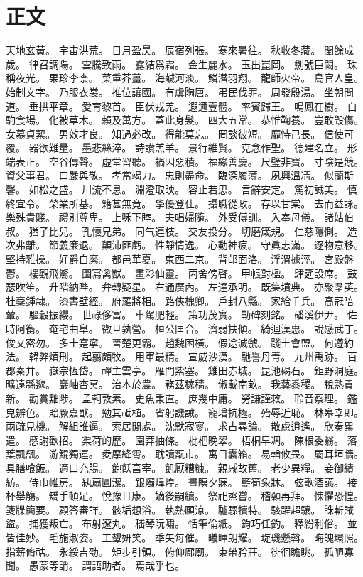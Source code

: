 \chapter{正文}%
\watermarkoff%
\thispagestyle{mychapter}%
\pagestyle{mytext}%
\ugenkogt%


天地玄黃。%
宇宙洪荒。%
日月盈昃。%
辰宿列張。%
寒來暑往。%
秋收冬藏。%
閏餘成歲。%
律召調陽。%
雲騰致雨。%
露結爲霜。%
金生麗水。%
玉出崑岡。%
劍號巨闕。%
珠稱夜光。%
果珍李柰。%
菜重芥薑。%
海鹹河淡。%
鱗潛羽翔。%
龍師火帝。%
鳥官人皇。%
始制文字。%
乃服衣裳。%
推位讓國。%
有虞陶唐。%
弔民伐罪。%
周發殷湯。%
坐朝問道。%
垂拱平章。%
愛育黎首。%
臣伏戎羌。%
遐邇壹體。%
率賓歸王。%
鳴鳳在樹。%
白駒食場。%
化被草木。%
賴及萬方。%
蓋此身髮。%
四大五常。%
恭惟鞠養。%
豈敢毀傷。%
女慕貞絜。%
男效才良。%
知過必改。%
得能莫忘。%
罔談彼短。%
靡恃己長。%
信使可覆。%
器欲難量。%
墨悲絲淬。%
詩讃羔羊。%
景行維賢。%
克念作聖。%
德建名立。%
形端表正。%
空谷傳聲。%
虛堂習聽。%
禍因惡積。%
福緣善慶。%
尺璧非寶。%
寸陰是競。%
資父事君。%
曰嚴與敬。%
孝當竭力。%
忠則盡命。%
臨深履薄。%
夙興溫凊。%
似蘭斯馨。%
如松之盛。%
川流不息。%
淵澄取映。%
容止若思。%
言辭安定。%
篤初誠美。%
慎終宜令。%
榮業所基。%
籍甚無竟。%
學優登仕。%
攝職從政。%
存以甘棠。%
去而益詠。%
樂殊貴賤。%
禮別尊卑。%
上咊下睦。%
夫唱婦隨。%
外受傅訓。%
入奉母儀。%
諸姑伯叔。%
猶子比兒。%
孔懷兄弟。%
同气連枝。%
交友投分。%
切磨箴規。%
仁慈隱惻。%
造次弗離。%
節義廉退。%
顛沛匪虧。%
性靜情逸。%
心動神疲。%
守眞志滿。%
逐物意移。%
堅持雅操。%
好爵自縻。%
都邑華夏。%
東西二京。%
背邙面洛。%
浮渭據涇。%
宮殿盤鬱。%
樓觀飛驚。%
圖寫禽獸。%
畫彩仙靈。%
丙舍傍啓。%
甲帳對楹。%
肆筵設席。%
鼓瑟吹笙。%
升階納陛。%
弁轉疑星。%
右通廣內。%
左達承明。%
既集墳典。%
亦聚羣英。%
杜稾鍾隸。%
漆書壁經。%
府羅將相。%
路俠槐卿。%
戶封八縣。%
家給千兵。%
高冠陪輦。%
驅轂振纓。%
世祿侈富。%
車駕肥輕。%
策功茂實。%
勒碑刻銘。%
磻溪伊尹。%
佐時阿衡。%
奄宅曲阜。%
微旦孰營。%
桓公匡合。%
濟弱扶傾。%
綺迴漢惠。%
說感武丁。%
俊乂密勿。%
多士寔寧。%
晉楚更霸。%
趙魏困橫。%
假途滅虢。%
踐土會盟。%
何遵約法。%
韓弊煩刑。%
起翦頗牧。%
用軍最精。%
宣威沙漠。%
馳譽丹青。%
九州禹跡。%
百郡秦并。%
嶽宗恆岱。%
禪主雲亭。%
雁門紫塞。%
雞田赤城。%
昆池碣石。%
鉅野洞庭。%
曠遠緜邈。%
巖岫杳冥。%
治本於農。%
務茲稼穡。%
俶載南畝。%
我藝黍稷。%
稅熟貢新。%
勸賞黜陟。%
孟軻敦素。%
史魚秉直。%
庶幾中庸。%
勞謙謹敕。%
聆音察理。%
鑑皃辧色。%
貽厥嘉猷。%
勉其祗植。%
省躬譏誡。%
寵增抗極。%
殆辱近恥。%
林皋幸即。%
兩疏見機。%
解組誰逼。%
索居閒處。%
沈默寂寥。%
求古尋論。%
散慮逍遙。%
欣奏累遣。%
慼謝歡招。%
渠荷的歷。%
園莽抽條。%
枇杷晚翠。%
梧桐早凋。%
陳根委翳。%
落葉飄颻。%
游鯤獨運。%
夌摩絳霄。%
耽讀翫市。%
寓目囊箱。%
易輶攸畏。%
屬耳垣牆。%
具膳喰飯。%
適口充腸。%
飽飫亯宰。%
飢厭糟糠。%
親戚故舊。%
老少異糧。%
妾御績紡。%
侍巾帷房。%
紈扇圓潔。%
銀燭煒煌。%
晝瞑夕寐。%
籃筍象牀。%
弦歌酒讌。%
接杯舉觴。%
矯手頓足。%
悅豫且康。%
嫡後嗣續。%
祭祀烝嘗。%
稽顙再拜。%
悚懼恐惶。%
箋牒簡要。%
顧答審詳。%
骸垢想浴。%
執熱願涼。%
驢騾犢特。%
駭躍超驤。%
誅斬賊盜。%
捕獲叛亡。%
布射遼丸。%
嵇琴阮嘯。%
恬筆倫紙。%
鈞巧任釣。%
釋紛利俗。%
並皆佳妙。%
毛施淑姿。%
工顰妍笑。%
秊矢每催。%
曦暉朗耀。%
琁璣懸斡。%
晦魄環照。%
指薪脩祜。%
永綏吉劭。%
矩步引領。%
俯仰廊廟。%
束帶矜莊。%
徘徊瞻眺。%
孤陋寡聞。%
愚蒙等誚。%
謂語助者。%
焉哉乎也。%
%
%